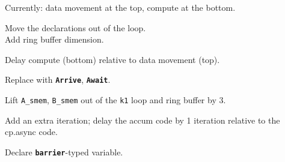 \newpage
{}

{\large

}

{\LARGE
Currently: data movement at the top, compute at the bottom.
}

\newpage
{}

{\large

}

{\LARGE
Move the  declarations out of the  loop.\\
Add ring buffer dimension.
}

\newpage
{}

{\large

}

{\LARGE
Delay compute (bottom) relative to data movement (top).
}

\newpage
{}

{\large

}

{\LARGE
Replace with \textbf{\texttt{Arrive}}, \textbf{\texttt{Await}}.
}

\newpage
{}

{\large

}

{\LARGE

Lift \texttt{A\_smem}, \texttt{B\_smem} out of the \texttt{k1} loop and ring buffer by 3.

}

\newpage
{}

{\large

}

{\LARGE

Add an extra  iteration; delay the accum code by 1 iteration relative to the cp.async code.

}

\newpage
{}

{\large

}

{\LARGE
Declare \textbf{\texttt{barrier}}-typed variable.

}

\newpage
{}

{\large

}

